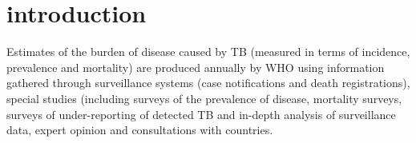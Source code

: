 \section{introduction}

Estimates of the burden of disease caused by TB (measured in terms of incidence, prevalence and mortality) are produced annually by WHO using information gathered through surveillance systems (case notifications and death registrations), special studies (including surveys of the prevalence of disease, mortality surveys, surveys of under-reporting of detected TB and in-depth analysis of surveillance data, expert opinion and consultations with countries. 
  
  